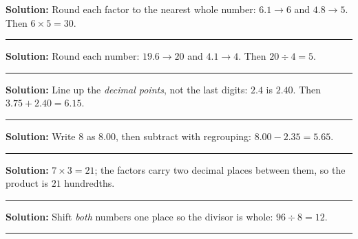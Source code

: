 \documentclass[12pt]{article}
\begin{document}



\textbf{Solution:} Round each factor to the nearest whole number:
$6.1 \to 6$ and $4.8 \to 5$. Then $6 \times 5 = 30$. 

\vspace{0.2cm}\noindent\rule{\linewidth}{0.2pt}\vspace{0.1cm}


\textbf{Solution:} Round each number: $19.6 \to 20$ and $4.1 \to 4$. Then
$20 \div 4 = 5$. 

\vspace{0.2cm}\noindent\rule{\linewidth}{0.2pt}\vspace{0.1cm}


\textbf{Solution:} Line up the \emph{decimal points}, not the last digits:
$2.4$ is $2.40$. Then $3.75 + 2.40 = 6.15$. 

\vspace{0.2cm}\noindent\rule{\linewidth}{0.2pt}\vspace{0.1cm}


\textbf{Solution:} Write $8$ as $8.00$, then subtract with regrouping:
$8.00 - 2.35 = 5.65$. 

\vspace{0.2cm}\noindent\rule{\linewidth}{0.2pt}\vspace{0.1cm}


\textbf{Solution:} $7 \times 3 = 21$; the factors carry two decimal places
between them, so the product is $21$ hundredths. 

\vspace{0.2cm}\noindent\rule{\linewidth}{0.2pt}\vspace{0.1cm}


\textbf{Solution:} Shift \emph{both} numbers one place so the divisor is
whole: $96 \div 8 = 12$. 

\vspace{0.2cm}\noindent\rule{\linewidth}{0.2pt}\vspace{0.1cm}
\end{document}
